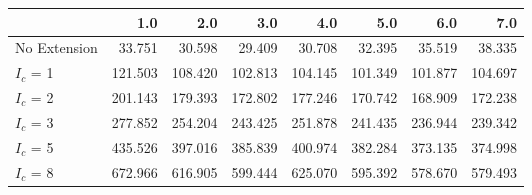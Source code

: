 \begin{tabular}{lrrrrrrr}
\toprule
{} &     1.0 &     2.0 &     3.0 &     4.0 &     5.0 &     6.0 &     7.0 \\
\midrule
No Extension &  33.751 &  30.598 &  29.409 &  30.708 &  32.395 &  35.519 &  38.335 \\
$I_c$ = 1    & 121.503 & 108.420 & 102.813 & 104.145 & 101.349 & 101.877 & 104.697 \\
$I_c$ = 2    & 201.143 & 179.393 & 172.802 & 177.246 & 170.742 & 168.909 & 172.238 \\
$I_c$ = 3    & 277.852 & 254.204 & 243.425 & 251.878 & 241.435 & 236.944 & 239.342 \\
$I_c$ = 5    & 435.526 & 397.016 & 385.839 & 400.974 & 382.284 & 373.135 & 374.998 \\
$I_c$ = 8    & 672.966 & 616.905 & 599.444 & 625.070 & 595.392 & 578.670 & 579.493 \\
\bottomrule
\end{tabular}
